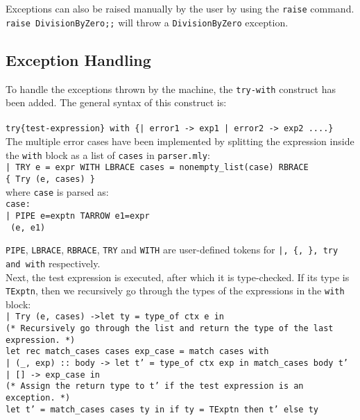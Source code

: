 \documentclass{article}
\begin{document}
        Exceptions can also be raised manually by the user by using the \texttt{raise} command.\\\texttt{raise DivisionByZero;;} will throw a \texttt{DivisionByZero} exception.
    
    \newpage
    \subsection{Exception Handling}
        To handle the exceptions thrown by the machine, the \texttt{try-with} construct has been added.
        The general syntax of this construct is:\\\\
        \texttt{try\{test-expression\} with \{| error1 -> exp1 | error2 -> exp2 ....\}}\\

        The multiple error cases have been implemented by splitting the expression inside the \texttt{with} block as a list of \texttt{cases} in \texttt{parser.mly}:\\
        \texttt{| TRY e = expr WITH LBRACE cases = nonempty\_list(case) RBRACE\\\{ Try (e, cases) \}}\\

        where \texttt{case} is parsed as:\\
        \texttt{case:\\| PIPE e=exptn TARROW e1=expr\\{ (e, e1) }}

        \texttt{PIPE}, \texttt{LBRACE}, \texttt{RBRACE}, \texttt{TRY} and \texttt{WITH} are user-defined tokens for \texttt{|, \{, \}, \texttt{try} and \texttt{with}} respectively.\\

        Next, the test expression is executed, after which it is type-checked. If its type is \texttt{TExptn}, then we recursively go through the types of the expressions in the \texttt{with} block:\\\texttt{| Try (e, cases) ->let ty = type\_of ctx e in\\(* Recursively go through the list and return the type of the last expression. *)\\let rec match\_cases cases exp\_case = match cases with\\| (\_, exp) :: body -> let t' = type\_of ctx exp in match\_cases body t'\\| [] -> exp\_case in\\(* Assign the return type to t' if the test expression is an exception. *)\\let t' = match\_cases cases ty in if ty = TExptn then t' else ty}\\
\end{document}
